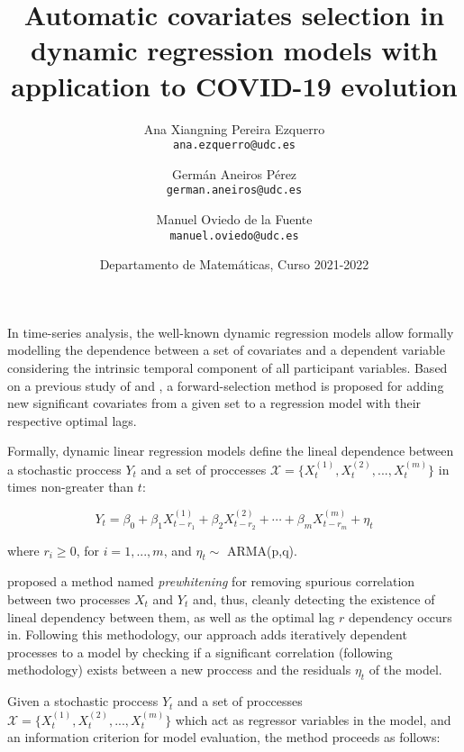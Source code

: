 \documentclass[12pt, a4paper, twoside]{article}
\title{\textbf{Automatic covariates selection in dynamic regression models with application to COVID-19 evolution}}
\author{Ana Xiangning Pereira Ezquerro \\ \texttt{ana.ezquerro@udc.es} \and 
        Germán Aneiros Pérez \\ \texttt{german.aneiros@udc.es} \and 
        Manuel Oviedo de la Fuente \\ \texttt{manuel.oviedo@udc.es}}
\date{Departamento de Matemáticas, Curso 2021-2022}
\begin{document}
\maketitle

In time-series analysis, the well-known dynamic regression models allow formally modelling the dependence between a set of covariates and a dependent variable considering the intrinsic temporal component of all participant variables. Based on a previous study of \cite{cryer2008time} and \cite{hyndman2018forecasting}, a forward-selection method is proposed for adding new significant covariates from a given set to a regression model with their respective optimal lags.

Formally, dynamic linear regression models define the lineal dependence between a stochastic proccess $Y_t$ and a set of proccesses  $\mathcal{X}=\{ X_t^{(1)}, X_t^{(2)}, ..., X_t^{(m)}\}$ in times non-greater than $t$:

\[ Y_t = \beta_0 + \beta_1 X^{(1)}_{t-r_1} + \beta_2 X^{(2)}_{t-r_2} + \cdots + \beta_m  X^{(m)}_{t-r_m} + \eta_t \]

where $r_i \geq 0$, for $i=1,...,m$, and $\eta_t \sim$ ARMA(p,q).


\cite{cryer2008time} proposed a method named \textit{prewhitening} for removing spurious correlation between two processes  $X_t$ and $Y_t$ and, thus, cleanly detecting the existence of lineal dependency between them, as well as the optimal lag $r$ dependency occurs in. Following this methodology, our approach adds iteratively dependent processes to a model by checking if a significant correlation (following \cite{cryer2008time} methodology) exists between a new proccess and the residuals $\eta_t$ of the model.

Given a stochastic proccess $Y_t$ and a set of proccesses $\mathcal{X}=\{ X_t^{(1)}, X_t^{(2)}, ..., X_t^{(m)}\}$ which act as regressor variables in the model, and an information criterion for model evaluation, the method proceeds as follows:
\end{document}
